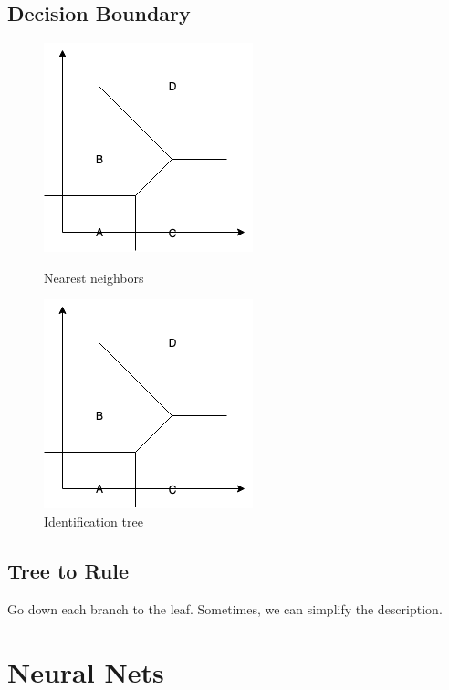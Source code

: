 \documentclass[12pt]{book}
\begin{document}
\subsection{Decision Boundary}
	\begin{figure}[htbp]
	\centering
	\begin{minipage}[t]{0.48\textwidth}
		\centering
		\includegraphics[]{Figure/Figure11_5.png}
		\caption{Nearest neighbors}
	\end{minipage}
	\begin{minipage}[t]{0.48\textwidth}
		\centering
		\includegraphics[]{Figure/Figure11_5.png}
		\caption{Identification tree}
	\end{minipage}
\end{figure}
\subsection{Tree to Rule}
\indent Go down each branch to the leaf. Sometimes, we can simplify the description. 
\newpage
\section{Neural Nets}
\end{document}
